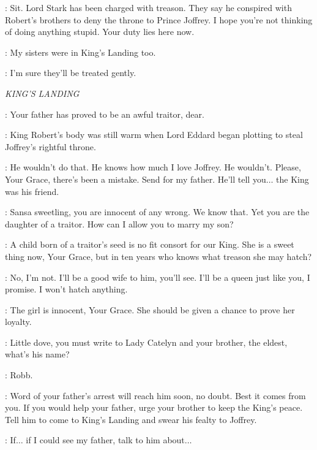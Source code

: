 \JEOR: Sit. Lord Stark has been charged with treason. They say he conspired with Robert's brothers to deny the throne to Prince Joffrey.  I hope you're not thinking of doing anything stupid. Your duty lies here now. 

\JON: My sisters were in King's Landing too. 

\JEOR: I'm sure they'll be treated gently. 


\scene

\textit{KING'S LANDING} 


\VARYS: Your father has proved to be an awful traitor, dear.

\PYCELLE: King Robert's body was still warm when Lord Eddard began plotting to steal Joffrey's rightful throne. 

\SANSA: He wouldn't do that. He knows how much I love Joffrey. He wouldn't. Please, Your Grace, there's been a mistake. Send for my father. He'll tell you$\ldots$ the King was his friend. 

\CERSEI: Sansa sweetling, you are innocent of any wrong. We know that. Yet you are the daughter of a traitor. How can I allow you to marry my son? 

\PYCELLE: A child born of a traitor's seed is no fit consort for our King. She is a sweet thing now, Your Grace, but in ten years who knows what treason she may hatch? 

\SANSA: No, I'm not. I'll be a good wife to him, you'll see. I'll be a queen just like you, I promise. I won't hatch anything. 

\LITTLEFINGER: The girl is innocent, Your Grace. She should be given a chance to prove her loyalty. 

\CERSEI: Little dove, you must write to Lady Catelyn and your brother, the eldest, what's his name?


\SANSA: Robb. 

\CERSEI: Word of your father's arrest will reach him soon, no doubt. Best it comes from you. If you would help your father, urge your brother to keep the King's peace.  Tell him to come to King's Landing and swear his fealty to Joffrey. 

\SANSA: If$\ldots$ if I could see my father, talk to him about$\ldots$  

